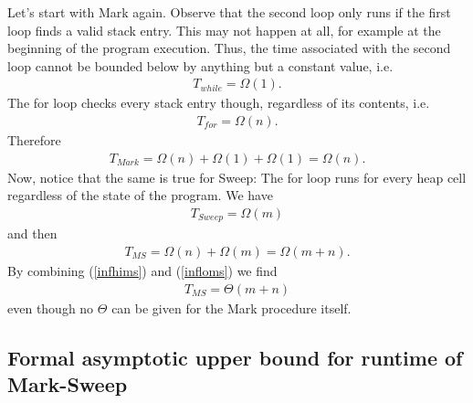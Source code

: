 \documentclass{article}
\begin{document}
Let's start with Mark again. Observe that the second loop only runs if
the first loop finds a valid stack entry. This may not happen at all, for
example at the beginning of the program execution. Thus, the time associated
with the second loop cannot be bounded below by anything but a constant value,
i.e.
\begin{align*}
    T_{while} = \Omega(1).
\end{align*}
The for loop checks every stack entry though, regardless of its contents, i.e.
\begin{align*}
    T_{for} = \Omega(n).
\end{align*}
Therefore
\begin{align*}
    T_{Mark} = \Omega(n) + \Omega(1) + \Omega(1) = \Omega(n).
\end{align*}
Now, notice that the same is true for Sweep: The for loop runs for every
heap cell regardless of the state of the program. We have
\begin{align*}
    T_{Sweep} = \Omega(m)
\end{align*}
and then
\begin{align}
    \label{infloms}
    T_{MS} = \Omega(n) + \Omega(m) = \Omega(m+n).
\end{align}
By combining (\ref{infhims}) and (\ref{infloms}) we find
\begin{align*}
    T_{MS} = \Theta(m+n)
\end{align*}
even though no $\Theta$ can be given for the Mark procedure itself.

\subsection{Formal asymptotic upper bound for runtime of Mark-Sweep}
\end{document}

